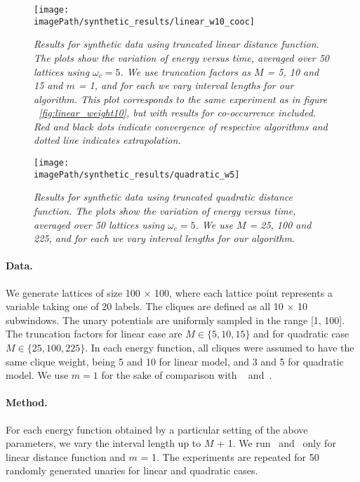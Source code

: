 \documentclass[10pt,letterpaper]{article}
\newcommand{\myparagraph}[1]{\vspace{0mm}\paragraph{#1}}
\newcommand{\mycaption}[1]{\vspace{0mm}\caption{#1}\vspace{0mm}}
\newcommand{\imagePath}{../../images}
\begin{document}
\begin{figure*}
\centerline{
\texttt{[image: \\imagePath/synthetic\_results/linear\_w10\_cooc]}
}
\vspace{3mm}
\mycaption{\footnotesize \em Results for synthetic data using truncated linear distance function. The plots show the variation of energy versus time, averaged over 50 lattices using $\omega_c = 5$. We use truncation factors as $M$ = 5, 10 and 15  and $m$ = 1, and for each we vary interval lengths for our algorithm. This plot corresponds to the same experiment as in figure ~\ref{fig:linear_weight10}, but with results for co-occurrence included. Red and black dots indicate convergence of respective algorithms and dotted line indicates extrapolation.}
\label{fig:linear_weight10_cooc}
\end{figure*}

\begin{figure*}
\centerline{
\texttt{[image: \\imagePath/synthetic\_results/quadratic\_w5]}
}
\vspace{3mm}
\mycaption{\footnotesize \em Results for synthetic data using truncated quadratic distance function. The plots show the variation of energy versus time, averaged over 50 lattices using $\omega_c = 5$. We use $M$ = 25, 100 and 225, and for each we vary interval lengths for our algorithm.}
\label{fig:quadratic_weight5}
\end{figure*}

\myparagraph{\bf Data.} We generate lattices of size 100 $\times$ 100, where each lattice point represents a variable taking one of 20 labels. The cliques are defined as all 10 $\times$ 10 subwindows. The unary potentials are uniformly sampled in the range [1, 100]. The truncation factors for linear case are $M \in \{5, 10, 15\}$ and for quadratic case $M \in \{25, 100, 225\}$. In each energy function, all cliques were assumed to have the same clique weight, being 5 and 10 for linear model, and 3 and 5 for quadratic model. We use $m = 1$ for the sake of comparison with ~\cite{dokaniaiccv15} and~\cite{ladickyeccv10}. %

\myparagraph{\bf Method.} For each energy function obtained by a particular setting of the above parameters, we vary the interval length up to $M$ + 1. We run~\cite{dokaniaiccv15} and~\cite{ladickyeccv10} only for linear distance function and $m$ = 1. The experiments are repeated for 50 randomly generated unaries for linear and quadratic cases. 
\end{document}
